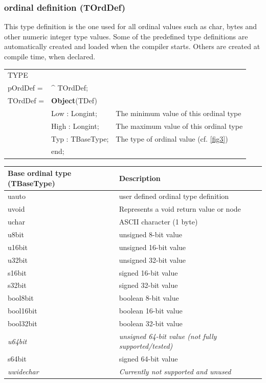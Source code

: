 \documentclass [a4paper,12pt]{article}
\begin{document}
\subsubsection{ordinal definition (TOrdDef)}
\label{subsubsec:ordinal}

This type definition is the one used for all ordinal values such as char,
bytes and other numeric integer type values. Some of the predefined type
definitions are automatically created and loaded when the compiler starts.
Others are created at compile time, when declared.

\begin{tabular*}{6.5in}{|l@{\extracolsep{\fill}}lp{9cm}|}
\hline
\textsf{TYPE} & &  \\
\xspace pOrdDef = & \^{}  TOrdDef; & \\
\xspace \textsf{TOrdDef} = & \textbf{Object}(TDef) & \\
&\textsf{Low : Longint;}&
	The minimum value of this ordinal type \\
&\textsf{High : Longint;}&
	The maximum value of this ordinal type \\
&\textsf{Typ : TBaseType;}&
	The type of ordinal value (cf. \ref{fig3}) \\
&\textsf{end;}&  \\
\hline
\end{tabular*}

\begin{longtable}{|l|p{10cm}|}
\hline
Base ordinal type (TBaseType) & Description \\
\hline
\endhead
\hline
\endfoot
\textsf{uauto} & user defined ordinal type definition \\
\textsf{uvoid} & Represents a void return value or node \\
\textsf{uchar} & ASCII character (1 byte) \\
\textsf{u8bit} & unsigned 8-bit value \\
\textsf{u16bit}& unsigned 16-bit value \\
\textsf{u32bit}& unsigned 32-bit value \\
\textsf{s16bit}& signed 16-bit value \\
\textsf{s32bit}& signed 32-bit value \\
\textsf{bool8bit}& boolean 8-bit value \\
\textsf{bool16bit}& boolean 16-bit value \\
\textsf{bool32bit}& boolean 32-bit value \\
\textsf{\textit{u64bit}}&
	\textit{unsigned 64-bit value (not fully supported/tested)} \\
\textsf{s64bit}& signed 64-bit value \\\textsf{\textit{uwidechar}}&
	\textit{Currently not supported and unused} \\
\end{longtable}
\end{document}
